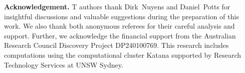 \documentclass[a4paper]{amsart}
\begin{document}
\vspace{10pt}

\noindent\textbf{Acknowledgement.}
T authors thank Dirk~Nuyens and Daniel~Potts for insightful discussions and valuable suggestions during the preparation of this work. We also thank both anonymous referees for their careful analysis and support. 
Further, w{}e acknowledge the financial support from the Australian Research Council Discovery Project DP240100769.
This research includes computations using the computational cluster Katana supported by Research Technology Services at UNSW Sydney.

\printbibliography
\end{document}
